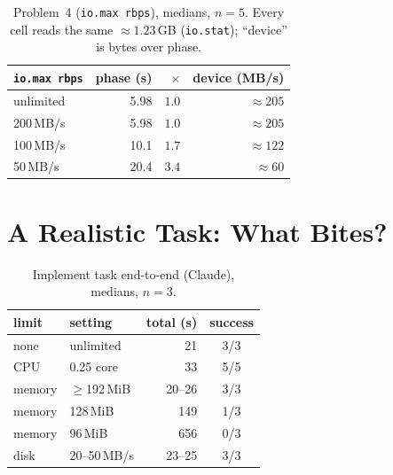 \documentclass[10pt,conference]{IEEEtran}
\newcommand{\uu}[1]{\,\textsf{#1}}
\begin{document}
\begin{table}[t]\centering\scriptsize
\setlength{\tabcolsep}{4pt}
\caption{Problem~4 (\texttt{io.max rbps}), medians, $n{=}5$. Every cell
reads the same ${\approx}1.23$\,GB (\texttt{io.stat}); ``device'' is bytes
over phase.}
\label{tab:io}
\begin{tabular}{@{}lrrr@{}}
\toprule
\texttt{io.max rbps} & phase (s) & $\times$ & device (MB/s)\\
\midrule
unlimited    & 5.98 & $1.0$ & ${\approx}205$ \\
200\uu{MB/s} & 5.98 & $1.0$ & ${\approx}205$ \\
100\uu{MB/s} & 10.1 & $1.7$ & ${\approx}122$ \\
50\uu{MB/s}  & 20.4 & $3.4$ & ${\approx}60$ \\
\bottomrule
\end{tabular}
\end{table}

\section{A Realistic Task: What Bites?}
\label{sec:e2e}

\begin{table}[t]\centering\scriptsize
\setlength{\tabcolsep}{4pt}
\caption{Implement task end-to-end (Claude), medians, $n{=}3$.}
\label{tab:e2e}
\begin{tabular}{@{}llrc@{}}
\toprule
limit & setting & total (s) & success\\
\midrule
none   & unlimited        & 21     & 3/3 \\
CPU    & 0.25 core        & 33     & 5/5 \\
memory & $\ge$192\,MiB    & 20--26 & 3/3 \\
memory & 128\,MiB         & 149    & 1/3 \\
memory & 96\,MiB          & 656    & 0/3 \\
disk   & 20--50\uu{MB/s}  & 23--25 & 3/3 \\
\bottomrule
\end{tabular}
\end{table}
\end{document}
